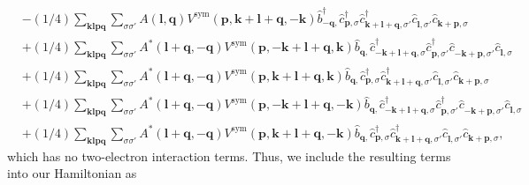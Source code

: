 \begin{align*}
	&-(1/4) \sum_{ \mathbf{k} \mathbf{l} \mathbf{p} \mathbf{q} } \sum_{ \sigma \sigma' } A( \mathbf{l}, \mathbf{q} )  V^\mathrm{sym}( \mathbf{p}, \mathbf{k}+\mathbf{l}+\mathbf{q}, -\mathbf{k} )   \hat{b}_{ -\mathbf{q}, }^\dagger  \hat{c}_{ \mathbf{p}, \sigma }^\dagger  \hat{c}_{ \mathbf{k}+\mathbf{l}+\mathbf{q}, \sigma' }^\dagger  \hat{c}_{ \mathbf{l}, \sigma' }^{\phantom{\dagger}} \hat{c}_{ \mathbf{k}+\mathbf{p}, \sigma }^{\phantom{\dagger}}  \\
	&+(1/4) \sum_{ \mathbf{k} \mathbf{l} \mathbf{p} \mathbf{q} } \sum_{ \sigma \sigma' } A^*( \mathbf{l}+\mathbf{q}, -\mathbf{q} )  V^\mathrm{sym}( \mathbf{p}, -\mathbf{k}+\mathbf{l}+\mathbf{q}, \mathbf{k} )   \hat{b}_{ \mathbf{q}, }^{\phantom{\dagger}} \hat{c}_{ -\mathbf{k}+\mathbf{l}+\mathbf{q}, \sigma }^\dagger  \hat{c}_{ \mathbf{p}, \sigma' }^\dagger  \hat{c}_{ -\mathbf{k}+\mathbf{p}, \sigma' }^{\phantom{\dagger}} \hat{c}_{ \mathbf{l}, \sigma }^{\phantom{\dagger}}  \\
	&+(1/4) \sum_{ \mathbf{k} \mathbf{l} \mathbf{p} \mathbf{q} } \sum_{ \sigma \sigma' } A^*( \mathbf{l}+\mathbf{q}, -\mathbf{q} )  V^\mathrm{sym}( \mathbf{p}, \mathbf{k}+\mathbf{l}+\mathbf{q}, \mathbf{k} )   \hat{b}_{ \mathbf{q}, }^{\phantom{\dagger}} \hat{c}_{ \mathbf{p}, \sigma }^\dagger  \hat{c}_{ \mathbf{k}+\mathbf{l}+\mathbf{q}, \sigma' }^\dagger  \hat{c}_{ \mathbf{l}, \sigma' }^{\phantom{\dagger}} \hat{c}_{ \mathbf{k}+\mathbf{p}, \sigma }^{\phantom{\dagger}}  \\
	&+(1/4) \sum_{ \mathbf{k} \mathbf{l} \mathbf{p} \mathbf{q} } \sum_{ \sigma \sigma' } A^*( \mathbf{l}+\mathbf{q}, -\mathbf{q} )  V^\mathrm{sym}( \mathbf{p}, -\mathbf{k}+\mathbf{l}+\mathbf{q}, -\mathbf{k} )   \hat{b}_{ \mathbf{q}, }^{\phantom{\dagger}} \hat{c}_{ -\mathbf{k}+\mathbf{l}+\mathbf{q}, \sigma }^\dagger  \hat{c}_{ \mathbf{p}, \sigma' }^\dagger  \hat{c}_{ -\mathbf{k}+\mathbf{p}, \sigma' }^{\phantom{\dagger}} \hat{c}_{ \mathbf{l}, \sigma }^{\phantom{\dagger}}  \\
	&+(1/4) \sum_{ \mathbf{k} \mathbf{l} \mathbf{p} \mathbf{q} } \sum_{ \sigma \sigma' } A^*( \mathbf{l}+\mathbf{q}, -\mathbf{q} )  V^\mathrm{sym}( \mathbf{p}, \mathbf{k}+\mathbf{l}+\mathbf{q}, -\mathbf{k} )   \hat{b}_{ \mathbf{q}, }^{\phantom{\dagger}} \hat{c}_{ \mathbf{p}, \sigma }^\dagger  \hat{c}_{ \mathbf{k}+\mathbf{l}+\mathbf{q}, \sigma' }^\dagger  \hat{c}_{ \mathbf{l}, \sigma' }^{\phantom{\dagger}} \hat{c}_{ \mathbf{k}+\mathbf{p}, \sigma }^{\phantom{\dagger}} 
, \end{align*}
which has no two-electron interaction terms. Thus, we include the resulting terms into our Hamiltonian as 
